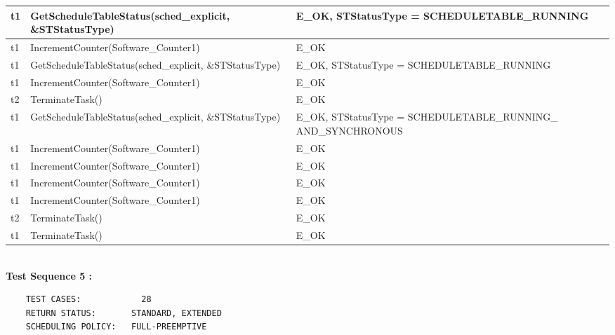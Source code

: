 \documentclass[10pt]{article}
\newlength{\Li}\settowidth{\Li}{Running}
\newlength{\Lii}\setlength{\Lii}{7cm}
\newlength{\Liiii}\setlength{\Liiii}{0.9cm}
\newlength{\Liii}\setlength{\Liii}{\textwidth} \addtolength{\Liii}{-\Li} \addtolength{\Liii}{-\Lii} \addtolength{\Liii}{-\Liiii}
\begin{document}
\begin{supertabular}{|p{\Li}|p{\Lii}|p{\Liii}|p{\Liiii}|}
	t1		& GetScheduleTableStatus(sched\_explicit, \&STStatusType)			& E\_OK, STStatusType = SCHEDULETABLE\_RUNNING 							& \\ \hline
	t1		& IncrementCounter(Software\_Counter1)						& E\_OK																	& \\ \hline
	t1		& GetScheduleTableStatus(sched\_explicit, \&STStatusType)			& E\_OK, STStatusType = SCHEDULETABLE\_RUNNING 							& \\ \hline
	t1		& IncrementCounter(Software\_Counter1)						& E\_OK																	& \\ \hline
	t2		& TerminateTask()											& E\_OK																	& \\ \hline
	t1		& GetScheduleTableStatus(sched\_explicit, \&STStatusType)			& E\_OK, STStatusType = SCHEDULETABLE\_RUNNING\_ AND\_SYNCHRONOUS		& \\ \hline
	t1		& IncrementCounter(Software\_Counter1)						& E\_OK																	& \\ \hline
	t1		& IncrementCounter(Software\_Counter1)						& E\_OK																	& \\ \hline
	t1		& IncrementCounter(Software\_Counter1)						& E\_OK																	& \\ \hline
	t1		& IncrementCounter(Software\_Counter1)						& E\_OK																	& \\ \hline
	t2		& TerminateTask()											& E\_OK																	& \\ \hline
	t1		& TerminateTask()											& E\_OK																	& \\ \hline
	\end{supertabular}\\

	\textbf{Test Sequence 5 :}
	\begin{lstlisting}
	TEST CASES:		       28
	RETURN STATUS:	  	 STANDARD, EXTENDED
	SCHEDULING POLICY:   FULL-PREEMPTIVE
	\end{lstlisting}
	
	
\end{document}
